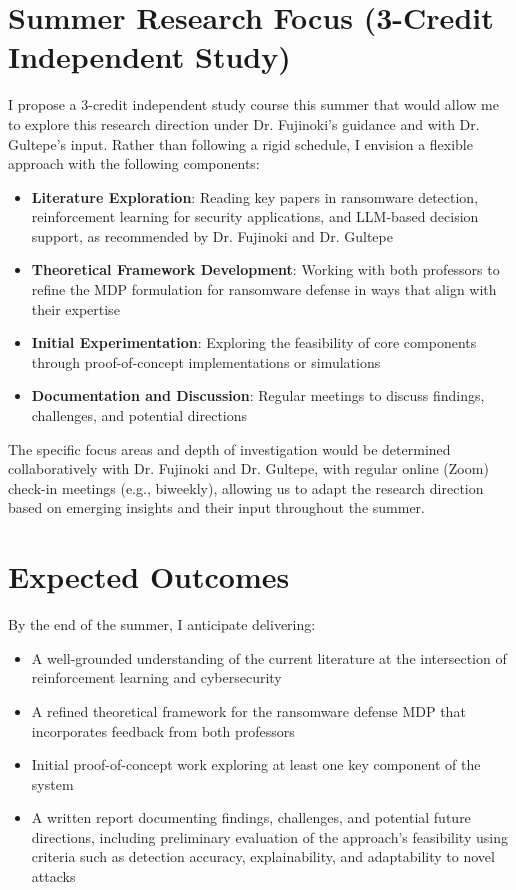 \documentclass[11pt]{article}
\begin{document}
\section*{Summer Research Focus (3-Credit Independent Study)}

I propose a 3-credit independent study course this summer that would allow me to explore this research direction under Dr. Fujinoki's guidance and with Dr. Gultepe's input. Rather than following a rigid schedule, I envision a flexible approach with the following components:

\begin{itemize}
    \item \textbf{Literature Exploration}: Reading key papers in ransomware detection, reinforcement learning for security applications, and LLM-based decision support, as recommended by Dr. Fujinoki and Dr. Gultepe
    
    \item \textbf{Theoretical Framework Development}: Working with both professors to refine the MDP formulation for ransomware defense in ways that align with their expertise
    
    \item \textbf{Initial Experimentation}: Exploring the feasibility of core components through proof-of-concept implementations or simulations
    
    \item \textbf{Documentation and Discussion}: Regular meetings to discuss findings, challenges, and potential directions
\end{itemize}

The specific focus areas and depth of investigation would be determined collaboratively with Dr. Fujinoki and Dr. Gultepe, with regular online (Zoom) check-in meetings (e.g., biweekly), allowing us to adapt the research direction based on emerging insights and their input throughout the summer.

\section*{Expected Outcomes}

By the end of the summer, I anticipate delivering:

\begin{itemize}
    \item A well-grounded understanding of the current literature at the intersection of reinforcement learning and cybersecurity
    
    \item A refined theoretical framework for the ransomware defense MDP that incorporates feedback from both professors
    
    \item Initial proof-of-concept work exploring at least one key component of the system
    
    \item A written report documenting findings, challenges, and potential future directions, including preliminary evaluation of the approach's feasibility using criteria such as detection accuracy, explainability, and adaptability to novel attacks
\end{itemize}
\end{document}
